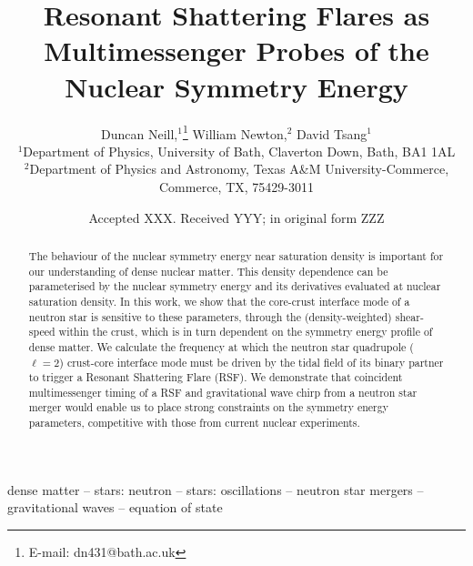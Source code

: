 \documentclass[fleqn,usenatbib]{mnras}
\title[Symmetry Energy Constraints from RSFs]{Resonant Shattering Flares as Multimessenger Probes of the Nuclear Symmetry Energy}
\author[D. Neill et al.]{
Duncan Neill,$^{1}$\thanks{E-mail: dn431@bath.ac.uk}
William Newton,$^{2}$
David Tsang$^{1}$
\\
$^{1}$Department of Physics, University of Bath, Claverton Down, Bath, BA1 1AL\\
$^{2}$Department of Physics and Astronomy, Texas A\&M University-Commerce, Commerce, TX, 75429-3011
}
\date{Accepted XXX. Received YYY; in original form ZZZ}
\begin{document}
\label{firstpage}
\pagerange{\pageref{firstpage}--\pageref{lastpage}}
\maketitle

\begin{abstract}
The behaviour of the nuclear symmetry energy near saturation density is important for our understanding of dense nuclear matter. This density dependence can be parameterised by the nuclear symmetry energy and its derivatives evaluated at nuclear saturation density. In this work, we show that the core-crust interface mode of a neutron star is sensitive to these parameters, through the (density-weighted) shear-speed within the crust, which is in turn dependent on the symmetry energy profile of dense matter. We calculate the frequency at which the neutron star quadrupole ($\ell = 2$) crust-core interface mode must be driven by the tidal field of its binary partner to trigger a Resonant Shattering Flare (RSF). We demonstrate that coincident multimessenger timing of a RSF and gravitational wave chirp from a neutron star merger would enable us to place strong constraints on the symmetry energy parameters, competitive with those from current nuclear experiments.
\end{abstract}

\begin{keywords}
dense matter -- stars: neutron -- stars: oscillations -- neutron star mergers -- gravitational waves -- equation of state
\end{keywords}





\end{document}
